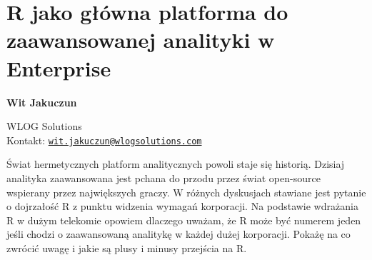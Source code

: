 \documentclass[\main/boa.tex]{subfiles}
\begin{document}
\section{R jako główna platforma do zaawansowanej analityki w Enterprise}


\begin{minipage}{0.915\textwidth}
	\centering
  {\bf \huge {} Wit Jakuczun}
\end{minipage}


\vskip 0.3cm

\begin{affiliations}
\begin{minipage}{0.915\textwidth}
\centering
\large WLOG Solutions \\[5pt]
Kontakt: \href{mailto:wit.jakuczun@wlogsolutions.com}{\nolinkurl{wit.jakuczun@wlogsolutions.com}}\\
\end{minipage}
\end{affiliations}

\vskip 0.8cm

Świat hermetycznych platform analitycznych powoli staje się historią. Dzisiaj analityka zaawansowana jest pchana do przodu przez świat open-source wspierany przez największych graczy. W różnych dyskusjach stawiane jest pytanie o dojrzałość R z punktu widzenia wymagań korporacji. Na podstawie wdrażania R w dużym telekomie opowiem dlaczego uważam, że R może być numerem jeden jeśli chodzi o zaawansowaną analitykę w każdej dużej korporacji. Pokażę na co zwrócić uwagę i jakie są plusy i minusy przejścia na R. 
\end{document}
